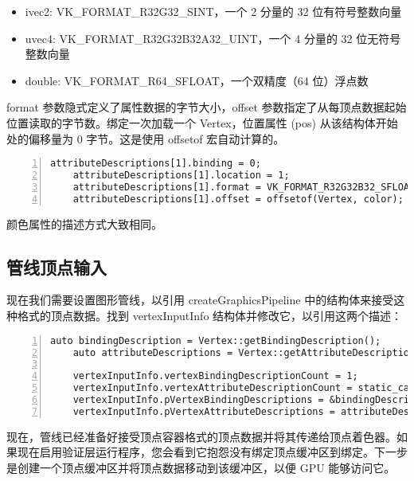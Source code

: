 \documentclass{ctexart}
\begin{document}
\begin{itemize}
	\item ivec2: VK\_FORMAT\_R32G32\_SINT，一个 2 分量的 32 位有符号整数向量
	\item uvec4: VK\_FORMAT\_R32G32B32A32\_UINT，一个 4 分量的 32 位无符号整数向量
	\item double: VK\_FORMAT\_R64\_SFLOAT，一个双精度（64 位）浮点数
\end{itemize}
format 参数隐式定义了属性数据的字节大小，offset 参数指定了从每顶点数据起始位置读取的字节数。绑定一次加载一个 Vertex，位置属性 (pos) 从该结构体开始处的偏移量为 0 字节。这是使用 offsetof 宏自动计算的。
\begin{lstlisting}[language={[ANSI]C},keywordstyle=\color{blue!70},commentstyle=\color{red!50!green!50!blue!50},frame=shadowbox, rulesepcolor=\color{red!20!green!20!blue!20},basicstyle=\small,numbers=left, numberstyle=\tiny,breaklines=true]
	attributeDescriptions[1].binding = 0;
	attributeDescriptions[1].location = 1;
	attributeDescriptions[1].format = VK_FORMAT_R32G32B32_SFLOAT;
	attributeDescriptions[1].offset = offsetof(Vertex, color);	
\end{lstlisting}
颜色属性的描述方式大致相同。

\subsection{管线顶点输入}
现在我们需要设置图形管线，以引用 createGraphicsPipeline 中的结构体来接受这种格式的顶点数据。找到 vertexInputInfo 结构体并修改它，以引用这两个描述：
\begin{lstlisting}[language={[ANSI]C},keywordstyle=\color{blue!70},commentstyle=\color{red!50!green!50!blue!50},frame=shadowbox, rulesepcolor=\color{red!20!green!20!blue!20},basicstyle=\small,numbers=left, numberstyle=\tiny,breaklines=true]
	auto bindingDescription = Vertex::getBindingDescription();
	auto attributeDescriptions = Vertex::getAttributeDescriptions();
	
	vertexInputInfo.vertexBindingDescriptionCount = 1;
	vertexInputInfo.vertexAttributeDescriptionCount = static_cast<uint32_t>(attributeDescriptions.size());
	vertexInputInfo.pVertexBindingDescriptions = &bindingDescription;
	vertexInputInfo.pVertexAttributeDescriptions = attributeDescriptions.data();	
\end{lstlisting}
现在，管线已经准备好接受顶点容器格式的顶点数据并将其传递给顶点着色器。如果现在启用验证层运行程序，您会看到它抱怨没有绑定顶点缓冲区到绑定。下一步是创建一个顶点缓冲区并将顶点数据移动到该缓冲区，以便 GPU 能够访问它。
\end{document}
